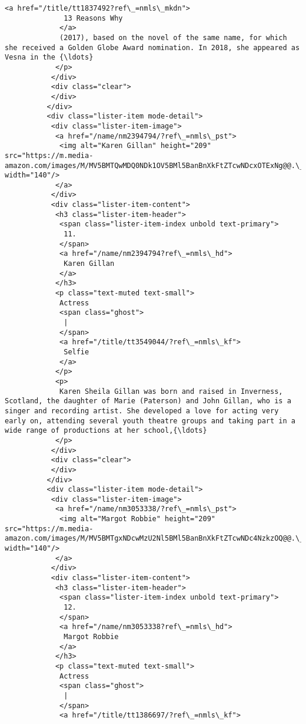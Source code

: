 \documentclass[11pt]{article}
\begin{document}
\begin{Verbatim}[commandchars=\\\{\}]
             <a href="/title/tt1837492?ref\_=nmls\_mkdn">
              13 Reasons Why
             </a>
             (2017), based on the novel of the same name, for which she received a Golden Globe Award nomination. In 2018, she appeared as Vesna in the {\ldots}
            </p>
           </div>
           <div class="clear">
           </div>
          </div>
          <div class="lister-item mode-detail">
           <div class="lister-item-image">
            <a href="/name/nm2394794/?ref\_=nmls\_pst">
             <img alt="Karen Gillan" height="209" src="https://m.media-amazon.com/images/M/MV5BMTQwMDQ0NDk1OV5BMl5BanBnXkFtZTcwNDcxOTExNg@@.\_V1\_UY209\_CR2,0,140,209\_AL\_.jpg" width="140"/>
            </a>
           </div>
           <div class="lister-item-content">
            <h3 class="lister-item-header">
             <span class="lister-item-index unbold text-primary">
              11.
             </span>
             <a href="/name/nm2394794?ref\_=nmls\_hd">
              Karen Gillan
             </a>
            </h3>
            <p class="text-muted text-small">
             Actress
             <span class="ghost">
              |
             </span>
             <a href="/title/tt3549044/?ref\_=nmls\_kf">
              Selfie
             </a>
            </p>
            <p>
             Karen Sheila Gillan was born and raised in Inverness, Scotland, the daughter of Marie (Paterson) and John Gillan, who is a singer and recording artist. She developed a love for acting very early on, attending several youth theatre groups and taking part in a wide range of productions at her school,{\ldots}
            </p>
           </div>
           <div class="clear">
           </div>
          </div>
          <div class="lister-item mode-detail">
           <div class="lister-item-image">
            <a href="/name/nm3053338/?ref\_=nmls\_pst">
             <img alt="Margot Robbie" height="209" src="https://m.media-amazon.com/images/M/MV5BMTgxNDcwMzU2Nl5BMl5BanBnXkFtZTcwNDc4NzkzOQ@@.\_V1\_UY209\_CR8,0,140,209\_AL\_.jpg" width="140"/>
            </a>
           </div>
           <div class="lister-item-content">
            <h3 class="lister-item-header">
             <span class="lister-item-index unbold text-primary">
              12.
             </span>
             <a href="/name/nm3053338?ref\_=nmls\_hd">
              Margot Robbie
             </a>
            </h3>
            <p class="text-muted text-small">
             Actress
             <span class="ghost">
              |
             </span>
             <a href="/title/tt1386697/?ref\_=nmls\_kf">

\end{Verbatim}
\end{document}
